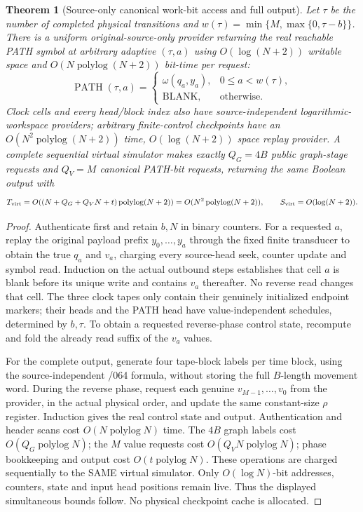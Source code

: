 \documentclass[11pt]{article}
\newtheorem{theorem}{Theorem}
\begin{document}
\begin{theorem}[Source-only canonical work-bit access and full output]
Let $\tau$ be the number of completed physical transitions and
$w(\tau)=\min\{M,\max\{0,\tau-b\}\}$.
There is a uniform original-source-only provider returning the
\emph{real reachable} PATH symbol at arbitrary adaptive
$(\tau,a)$ using $O(\log(N+2))$ writable space and
$O(N\operatorname{polylog}(N+2))$ bit-time per request:
\[
\operatorname{PATH}(\tau,a)=
\begin{cases}
\omega(q_a,y_a),&0\le a<w(\tau),\\
\mathrm{BLANK},&\text{otherwise}.
\end{cases}
\]
Clock cells and every head/block index also have source-independent
logarithmic-workspace providers; arbitrary finite-control checkpoints
have an $O(N^2\operatorname{polylog}(N+2))$ time,
$O(\log(N+2))$ space replay provider.
A complete sequential virtual simulator makes exactly
$Q_G=4B$ public graph-stage requests and $Q_V=M$ canonical
PATH-bit requests, returning the same Boolean output with
\[
T_{\rm virt}=O((N+Q_G+Q_VN+t)
  \operatorname{polylog}(N+2))
   =O(N^2\operatorname{polylog}(N+2)),\qquad
S_{\rm virt}=O(\log(N+2)).
\]
\end{theorem}
\begin{proof}
Authenticate first and retain $b,N$ in binary counters.
For a requested $a$, replay the original payload prefix
$y_0,\ldots,y_a$ through the fixed finite transducer to obtain
the true $q_a$ and $v_a$, charging every source-head seek,
counter update and symbol read. Induction on the actual
outbound steps establishes that cell $a$ is blank before its
unique write and contains $v_a$ thereafter. No reverse read
changes that cell. The three clock tapes only contain their
genuinely initialized endpoint markers; their heads and the
PATH head have value-independent schedules, determined by
$b,\tau$. To obtain a requested reverse-phase control state,
recompute and fold the already read suffix of the $v_a$ values.

For the complete output, generate four tape-block labels per
time block, using the source-independent /064 formula, without
storing the full $B$-length movement word. During the reverse
phase, request each genuine $v_{M-1},\ldots,v_0$ from the
provider, in the actual physical order, and update the same
constant-size $\rho$ register. Induction gives the real
control state and output. Authentication and header scans
cost $O(N\operatorname{polylog}N)$ time.
The $4B$ graph labels cost $O(Q_G\operatorname{polylog}N)$;
the $M$ value requests cost
$O(Q_VN\operatorname{polylog}N)$; phase bookkeeping and
output cost $O(t\operatorname{polylog}N)$. These operations
are charged sequentially to the SAME virtual simulator.
Only $O(\log N)$-bit addresses, counters, state and input
head positions remain live. Thus the displayed simultaneous
bounds follow. No physical checkpoint cache is allocated.
\end{proof}
\end{document}
